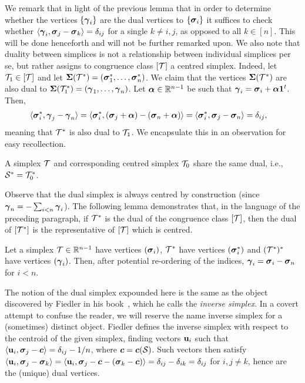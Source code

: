 We remark that in light of the previous lemma that in order to determine whether the vertices $\{\vb*{\gamma}_i\}$ are the dual vertices to $\{\vb*{\sigma}_i\}$ it suffices to check whether $\langle \vb*{\gamma}_i,\vb*{\sigma}_j-\vb*{\sigma}_k\rangle=\delta_{ij}$ for a single $k\neq i,j$, as opposed to all $k\in[n]$. This will be done henceforth and will not be further remarked upon. 
We also note that duality between simplices is not a relationship between individual simplices per se, but rather assigns to congruence class $[\mathcal{T}]$ a centred simplex. Indeed, let $\mathcal{T}_1\in[\mathcal{T}]$
and  let $\boldsymbol{\Sigma}(\mathcal{T}^*)=(\vb*{\sigma}_1^*,\dots,\vb*{\sigma}_n^*)$. We claim that  the vertices $\boldsymbol{\Sigma}(\mathcal{T}^*)$ are also dual to $\boldsymbol{\Sigma}(\mathcal{T}_1^*)=(\vb*{\gamma}_1,\dots,\vb*{\gamma}_n)$. Let  $\vb*{\alpha}\in\mathbb{R}^{n-1}$  be such that $\vb*{\gamma}_i = \vb*{\sigma}_i + \vb*{\alpha}\vb{1}^t$. Then, 
\begin{align*}
\langle \vb*{\sigma}_i^*,\vb*{\gamma}_j-\vb*{\gamma}_n\rangle &= \langle \vb*{\sigma}_i^*,(\vb*{\sigma}_j+\vb*{\alpha}) - (\vb*{\sigma}_n+\vb*{\alpha})\rangle = \langle \vb*{\sigma}_i^*,\vb*{\sigma}_j-\vb*{\sigma}_n\rangle=\delta_{ij},
\end{align*}
meaning that $\mathcal{T}^*$ is also dual to $\mathcal{T}_1$. We encapsulate this in an observation for easy recollection. 

\begin{observation}
	\label{obs:dual_centred}
	A simplex $\mathcal{T}$ and corresponding centred simplex $\mathcal{T}_0$ share the same dual, i.e., $\mathcal{S}^* = \mathcal{T}_0^*$. 
\end{observation}


Observe that the dual simplex is always centred by construction (since $\vb*{\gamma}_n=-\sum_{i<n}\vb*{\gamma}_i$).  The following lemma demonstrates that, in the language of the preceding paragraph, if $\mathcal{T}^*$ is the dual of the congruence class $[\mathcal{T}]$, then the dual of $[\mathcal{T}^*]$ is the representative of $[\mathcal{T}]$ which is centred. 

\begin{lemma}
	\label{lem:dual_of_dual}
	Let a simplex $\mathcal{T}\in\mathbb{R}^{n-1}$ have vertices $(\vb*{\sigma}_i)$, $\mathcal{T}^*$ have vertices $(\vb*{\sigma}_i^*)$ and $(\mathcal{T}^*)^*$ have vertices $(\vb*{\gamma}_i)$. Then, after potential re-ordering of the indices, $\vb*{\gamma}_i = \vb*{\sigma}_i-\vb*{\sigma}_n$ for $i<n$. 
\end{lemma}

\begin{remark}
	The notion of the dual simplex expounded here is the same as the object discovered by Fiedler in his book~\cite[Chapter 5]{fiedler2011matrices}, which he calls the \emph{inverse simplex}. In a covert attempt to confuse the reader, we will reserve the name inverse simplex for a (sometimes) distinct object. Fiedler defines the inverse simplex with respect to the centroid of the given simplex, finding vectors $\vb{u}_i$ such that $\langle \vb{u}_i,\vb*{\sigma}_j-\vb*{c}\rangle = \delta_{ij}-1/n$, where $\vb*{c}=\vb*{c}(\mathcal{S})$.  Such vectors then satisfy $\langle \vb{u}_i,\vb*{\sigma}_j-\vb*{\sigma}_k\rangle = \langle \vb{u}_i,\vb*{\sigma}_j-\vb*{c}-(\vb*{\sigma}_k-\vb*{c})\rangle = \delta_{ij}-\delta_{ik}=\delta_{ij}$ for $i,j\neq k$, hence are the (unique) dual vertices. 
\end{remark}

